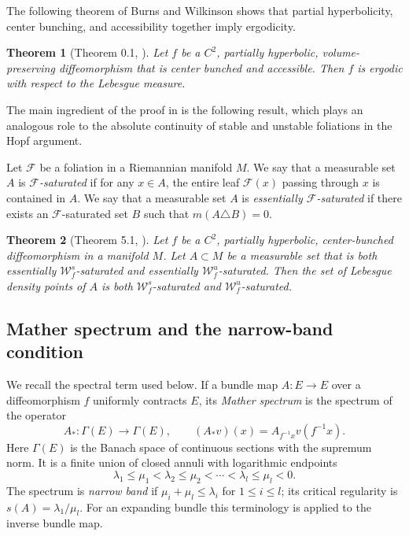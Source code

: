 \documentclass[11pt]{amsart}
\numberwithin{equation}{section}
\theoremstyle{plain}
\newtheorem{thm}{Theorem}[section]
\begin{document}
The following theorem of Burns and Wilkinson \cite{BWerg} shows that partial hyperbolicity, center bunching, and accessibility together imply ergodicity.

\begin{thm}[Theorem 0.1, \cite{BWerg}]\label{accerg}
Let $f$ be a $C^2$, partially hyperbolic, volume-preserving diffeomorphism that is center bunched and accessible. Then $f$ is ergodic with respect to the Lebesgue measure.
\end{thm}


The main ingredient of the proof in \cite{BWerg} is the following result, which plays an analogous role to the absolute continuity of stable and unstable foliations in the Hopf argument.

Let $\mathcal F$ be a foliation in a Riemannian manifold $M$. We say that a measurable set $A$ is \emph{$\mathcal F$-saturated} if for any $x\in A$, the entire leaf $\mathcal{F}(x)$ passing through $x$ is contained in $A$. We say that a measurable set $A$ is \emph{essentially $\mathcal F$-saturated} if there exists an $\mathcal F$-saturated set $B$ such that $m(A\triangle B)=0$.

\begin{thm}[Theorem 5.1, \cite{BWerg}]\label{burnswikerg}
Let $f$ be a $C^2$, partially hyperbolic, center-bunched diffeomorphism in a manifold $M$. Let $A\subset M$ be a measurable set that is both essentially $\mathcal{W}^s_f$-saturated and essentially $\mathcal{W}^u_f$-saturated. Then the set of Lebesgue density points of $A$ is both $\mathcal{W}^s_f$-saturated and $\mathcal{W}^u_f$-saturated.
\end{thm}


\subsection{Mather spectrum and the narrow-band condition}
\label{subsec:mather-spectrum}

We recall the spectral term used below.  If a bundle map
$A:E\to E$ over a diffeomorphism $f$ uniformly contracts $E$, its
\emph{Mather spectrum} is the spectrum of the operator
\[
 A_*:\Gamma(E)\to\Gamma(E),\qquad
 (A_*v)(x)=A_{f^{-1}x}v(f^{-1}x).
\]
Here $\Gamma(E)$ is the Banach space of continuous sections with the
supremum norm.
It is a finite union of closed annuli with logarithmic endpoints
\[
 \lambda_1\le\mu_1<\lambda_2\le\mu_2<\cdots
 <\lambda_l\le\mu_l<0.
\]
The spectrum is \emph{narrow band} if
$\mu_i+\mu_l\le\lambda_i$ for $1\le i\le l$; its critical regularity is
$s(A)=\lambda_1/\mu_l$.  For an expanding bundle this terminology is
applied to the inverse bundle map.  
\end{document}
